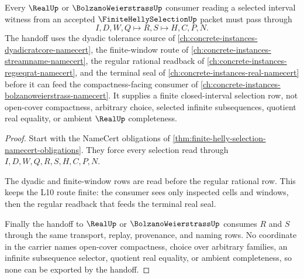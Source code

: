 \begin{theorem}
\label{thm:finite-helly-selection-interval-handoff}
Every $\RealUp$ or $\BolzanoWeierstrassUp$ consumer reading a selected interval witness from an accepted $\FiniteHellySelectionUp$ packet must pass through
$$
I,D,W,Q \longmapsto R,S \longmapsto H,C,P,N .
$$
The handoff uses the dyadic tolerance source of \autoref{ch:concrete-instances-dyadicratcore-namecert}, the finite-window route of \autoref{ch:concrete-instances-streamname-namecert}, the regular rational readback of \autoref{ch:concrete-instances-regseqrat-namecert}, and the terminal seal of \autoref{ch:concrete-instances-real-namecert} before it can feed the compactness-facing consumer of \autoref{ch:concrete-instances-bolzanoweierstrass-namecert}. It supplies a finite closed-interval selection row, not open-cover compactness, arbitrary choice, selected infinite subsequences, quotient real equality, or ambient $\RealUp$ completeness.
\end{theorem}
\begin{proof}
Start with the NameCert obligations of \autoref{thm:finite-helly-selection-namecert-obligations}. They force every selection read through $I,D,W,Q,R,S,H,C,P,N$.

The dyadic and finite-window rows are read before the regular rational row. This keeps the L10 route finite: the consumer sees only inspected cells and windows, then the regular readback that feeds the terminal real seal.

Finally the handoff to $\RealUp$ or $\BolzanoWeierstrassUp$ consumes $R$ and $S$ through the same transport, replay, provenance, and naming rows. No coordinate in the carrier names open-cover compactness, choice over arbitrary families, an infinite subsequence selector, quotient real equality, or ambient completeness, so none can be exported by the handoff.
\end{proof}


\begin{closurestatus}{\FiniteHellySelectionUp}
  \theoryclosure{\seedClosure}
  \formalstatus{\unformalizedV}
\end{closurestatus}
